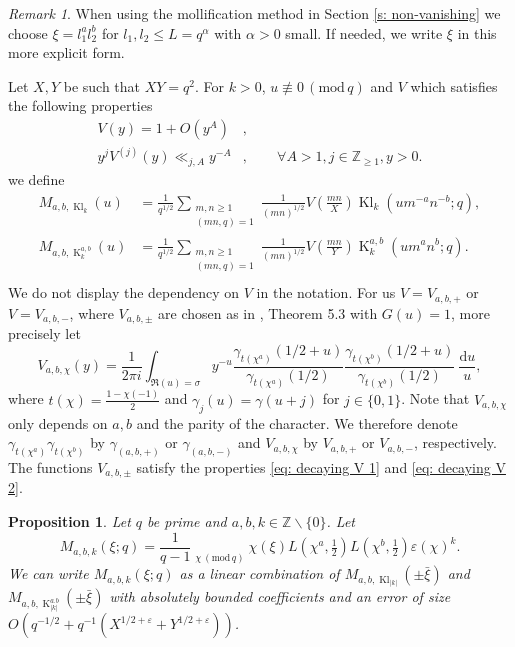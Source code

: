 \documentclass[12pt]{amsart}
\theoremstyle{plain}
\newtheorem{prop}[thm]{Proposition}
\theoremstyle{definition}
\theoremstyle{remark}
\newtheorem{rem}[thm]{Remark}
\numberwithin{equation}{section}
\newcommand{\ZZ}{\mathbb{Z}}
\newcommand\sumst{\mathop{{\sum}^\ast}\limits}
\newcommand{\mods}[1]{\,(\mathrm{mod}\,{#1})}
\renewcommand{\geq}{\geqslant}
\renewcommand{\leq}{\leqslant}
\DeclareMathOperator{\Kl}{Kl}%
\DeclareMathOperator{\K}{K} %
\begin{document}
\begin{rem}\label{rem xi with l1 and l2}
    When using the mollification method in Section \ref{s: non-vanishing} we choose $\xi=l_1^al_2^b$ for $l_1,l_2\leq L=q^\alpha$ with $\alpha>0$ small. If needed, we write $\xi$ in this more explicit form.  
\end{rem}
Let $X,Y$ be such that $XY=q^2$.
For $k>0$, $u\not\equiv 0 \mods{q}$ and $V$ which satisfies the following properties 
\begin{align}
    V(y) = 1+O(y^A)&,   \label{eq: decaying V 1} \\
    y^jV^{(j)}(y) \ll_{j,A} y^{-A}&, \qquad \forall A>1,j \in \ZZ_{\geq 1}, y>0.\label{eq: decaying V 2} 
\end{align}we define
\begin{align*}M_{a,b,\Kl_k}(u) &= \frac{1}{q^{1/2}}\sum_{\substack{m,n\geq 1\\(mn,q)=1}}\frac{1}{(mn)^{1/2}}V\left(\frac{mn}{X}\right)\Kl_k(um^{-a}n^{-b};q),\\
M_{a,b,\K_k^{a,b}}(u) &= \frac{1}{q^{1/2}}\sum_{\substack{m,n\geq 1\\(mn,q)=1}}\frac{1}{(mn)^{1/2}}V\left(\frac{mn}{Y}\right)\K^{a,b}_k(um^an^b;q).\\
\end{align*}
We do not display the dependency on $V$ in the notation. 
For us $V= V_{a,b,+}$ or $V=V_{a,b,-}$, where $V_{a,b,\pm }$ are chosen as in \cite{IwaKowAnalyticNT}, Theorem 5.3 with $G(u)=1$, more precisely let
\begin{equation*}
    V_{a,b,\chi}(y) = \frac{1}{2\pi i}\int_{\Re(u)=\sigma}y^{-u}\frac{\gamma_{t(\chi^a)}(1/2+u)}{\gamma_{t(\chi^a)}(1/2)}\frac{\gamma_{t(\chi^b)}(1/2+u)}{\gamma_{t(\chi^b)}(1/2)} \ \frac{\mathrm{d}u}{u},
\end{equation*}
    where $t(\chi)=\frac{1-\chi(-1)}{2}$ and $\gamma_j(u ) = \gamma(u+j)$ for $j\in \{0,1\}$. Note that $V_{a,b,\chi}$ only depends on $a,b$ and the parity of the character. We therefore denote  $\gamma_{t(\chi^a)}\gamma_{t(\chi^b)}$ by $\gamma_{(a,b,+)}$ or $\gamma_{(a,b,-)}$ and $V_{a,b,\chi}$ by $V_{a,b,+}$ or $V_{a,b,-}$, respectively.
   The functions $V_{a,b,\pm}$ satisfy the properties \eqref{eq: decaying V 1} and \eqref{eq: decaying V 2}.
   



\begin{prop}\label{prop: application AFE} Let $q$ be prime and $a,b,k\in \ZZ\smallsetminus\{0\}$. 
Let $$M_{a,b,k}(\xi;q)=\frac{1}{q-1} \sumst_{\chi\mods q}\chi(\xi)L(\chi^a,\tfrac 12)L(\chi^b,\tfrac 12)\varepsilon(\chi)^k.$$ 
    We can write $M_{a,b,k}(\xi;q)$ as a linear combination of $M_{a,b,\Kl_{\vert{k}\vert}}(\pm \bar \xi)$ and $M_{a,b,\K^{a.b}_{\vert{k}\vert}}(\pm \bar \xi)$ with absolutely bounded coefficients and an error of size $O\left(q^{-1/2}+q^{-1}\left(X^{1/2+\varepsilon}+Y^{1/2+\varepsilon}\right)\right)$. 
\end{prop}
\end{document}
